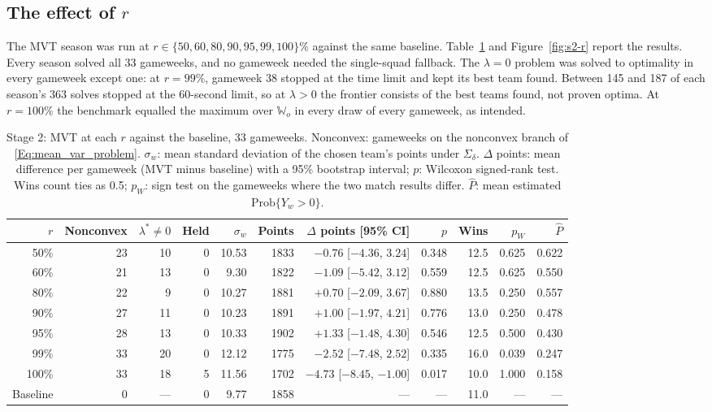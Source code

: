 \documentclass[12pt,oneside,a4paper]{book}
\theoremstyle{definition}
\theoremstyle{remark}
\begin{document}
	\subsection{The effect of $r$}
	\label{sec:s2-r}

	The MVT season was run at $r\in\{50,60,80,90,95,99,100\}\%$ against the same baseline.
	Table~\ref{tab:s2-r} and Figure~\ref{fig:s2-r} report the results. Every season solved all 33
	gameweeks, and no gameweek needed the single-squad fallback. The $\lambda=0$ problem was solved
	to optimality in every gameweek except one: at $r=99\%$, gameweek 38 stopped at the time limit
	and kept its best team found. Between 145 and 187 of each season's 363 solves stopped at the
	60-second limit, so at $\lambda>0$ the frontier consists of the best teams found, not proven
	optima. At $r=100\%$ the benchmark equalled the maximum over $\mathbb{W}_o$ in every draw of
	every gameweek, as intended.

	\begin{table}[ht]
		\centering
		\caption{Stage 2: MVT at each $r$ against the baseline, 33 gameweeks. Nonconvex: gameweeks on
			the nonconvex branch of \eqref{Eq:mean_var_problem}. $\sigma_w$: mean standard deviation of the chosen team's points
			under $\Sigma_\delta$. $\Delta$ points: mean difference per gameweek (MVT minus baseline) with a
			95\% bootstrap interval; $p$: Wilcoxon signed-rank test. Wins count ties as 0.5; $p_W$: sign
			test on the gameweeks where the two match results differ. $\hat P$: mean estimated
			$\mathrm{Prob}\{Y_w>0\}$.}
		\label{tab:s2-r}
		\footnotesize
		\setlength{\tabcolsep}{3pt}
		\begin{tabular}{rrrrrrrrrrr}
			\toprule
			$r$ & Nonconvex & $\lambda^*\neq0$ & Held & $\sigma_w$ & Points & $\Delta$ points [95\% CI] & $p$ & Wins & $p_W$ & $\hat P$ \\
			\midrule
			50\%  & 23 & 10 & 0 & 10.53 & 1833 & $-0.76$ [$-4.36$, $3.24$] & 0.348 & 12.5 & 0.625 & 0.622 \\
			60\%  & 21 & 13 & 0 &  9.30 & 1822 & $-1.09$ [$-5.42$, $3.12$] & 0.559 & 12.5 & 0.625 & 0.550 \\
			80\%  & 22 &  9 & 0 & 10.27 & 1881 & $+0.70$ [$-2.09$, $3.67$] & 0.880 & 13.5 & 0.250 & 0.557 \\
			90\%  & 27 & 11 & 0 & 10.23 & 1891 & $+1.00$ [$-1.97$, $4.21$] & 0.776 & 13.0 & 0.250 & 0.478 \\
			95\%  & 28 & 13 & 0 & 10.33 & 1902 & $+1.33$ [$-1.48$, $4.30$] & 0.546 & 12.5 & 0.500 & 0.430 \\
			99\%  & 33 & 20 & 0 & 12.12 & 1775 & $-2.52$ [$-7.48$, $2.52$] & 0.335 & 16.0 & 0.039 & 0.247 \\
			100\% & 33 & 18 & 5 & 11.56 & 1702 & $-4.73$ [$-8.45$, $-1.00$] & 0.017 & 10.0 & 1.000 & 0.158 \\
			\midrule
			Baseline & 0 & --- & 0 & 9.77 & 1858 & --- & --- & 11.0 & --- & --- \\
			\bottomrule
		\end{tabular}
	\end{table}
\end{document}
